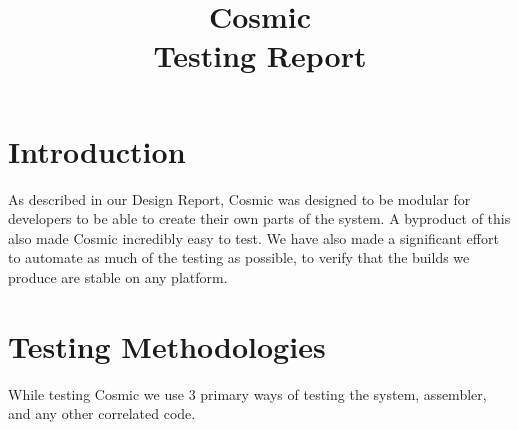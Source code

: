 \documentclass[conference]{IEEEtran}
\begin{document}
\title{
 Cosmic\\Testing Report}

\author{
\and
{}

}

\maketitle

\section{Introduction}
As described in our Design Report, Cosmic was designed to be modular for developers to be able to create their own parts of the system. A byproduct of this also made Cosmic incredibly easy to test. We have also made a significant effort to automate as much of the testing as possible, to verify that the builds we produce are stable on any platform. 
\section{Testing Methodologies}
While testing Cosmic we use 3 primary ways of testing the system, assembler, and any other correlated code.
\end{document}
